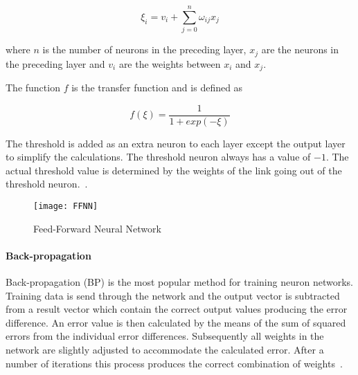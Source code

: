 \begin{equation}
  \xi_i = v_i + \sum_{j = 0}^{n} {\omega_{ij}x_{j}}
  \label{neuron_sum}
\end{equation}

\noindent
where $n$ is the number of neurons in the preceding layer, $x_j$ are the neurons in the preceding layer and $v_i$ are the weights between $x_i$ and $x_j$.

The function $f$ is the transfer function and is defined as

\begin{equation}
  f(\xi) = \frac {1} {1 + exp(-\xi)}
\end{equation}

The threshold is added as an extra neuron to each layer except the output layer to simplify the calculations. The threshold neuron always has a value of $-1$. The actual threshold value is determined by the weights of the link going out of the threshold neuron.~\cite{svozil1997introduction}.


\begin{figure}[H]
  \centering
    \texttt{[image: FFNN]}
    \caption{Feed-Forward Neural Network}
    \label{figure:FFNN}
\end{figure}


\paragraph{Back-propagation}

Back-propagation (BP) is the most popular method for training neuron networks. Training data is send through the network and the output vector is subtracted from a result vector which contain the correct output values producing the error difference. An error value is then calculated by the means of the sum of squared errors from the individual error differences. Subsequently all weights in the network are slightly adjusted to accommodate the calculated error. After a number of iterations this process produces the correct combination of weights~\cite{engelbrecht2007computational}.
